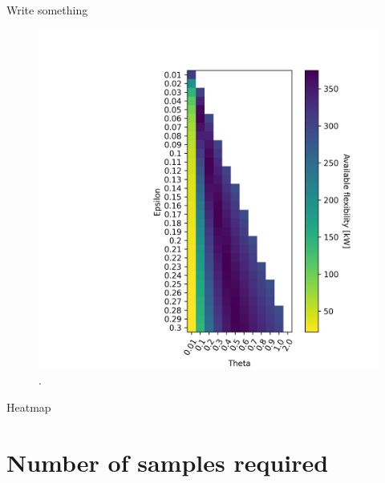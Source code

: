 \documentclass{report}
\begin{document}
Write something

\begin{figure}[!t]
    \centering
    \includegraphics[width=0.99\columnwidth]{figures/heatmap.png}
    \caption{.}
\end{figure}

Heatmap

\section*{Number of samples required}

\printbibliography
\end{document}
